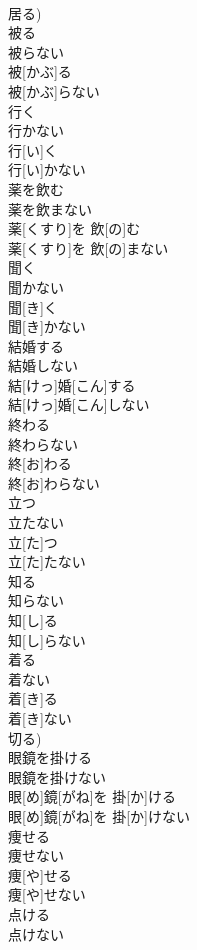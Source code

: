 \documentclass[8pt]{extreport}
\begin{document}
\begin{CJK}{UTF8}{min}
\\	居る)
\\	被る 
\\	被らない	
\\	被[かぶ]る 
\\	被[かぶ]らない
\\	行く 
\\	行かない	
\\	行[い]く 
\\	行[い]かない
\\	薬を飲む 
\\	薬を飲まない	
\\	薬[くすり]を 飲[の]む 
\\	薬[くすり]を 飲[の]まない
\\	聞く 
\\	聞かない	
\\	聞[き]く 
\\	聞[き]かない
\\	結婚する 
\\	結婚しない	
\\	結[けっ]婚[こん]する 
\\	結[けっ]婚[こん]しない
\\	終わる 
\\	終わらない	
\\	終[お]わる 
\\	終[お]わらない
\\	立つ 
\\	立たない	
\\	立[た]つ 
\\	立[た]たない
\\	知る 
\\	知らない	
\\	知[し]る 
\\	知[し]らない
\\	着る 
\\	着ない	
\\	着[き]る 
\\	着[き]ない 
\\	切る)
\\	眼鏡を掛ける 
\\	眼鏡を掛けない	
\\	眼[め]鏡[がね]を 掛[か]ける 
\\	眼[め]鏡[がね]を 掛[か]けない
\\	痩せる 
\\	痩せない	
\\	痩[や]せる 
\\	痩[や]せない
\\	点ける 
\\	点けない	

\end{CJK}
\end{document}
